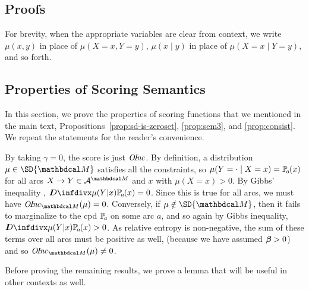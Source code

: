 \begin{subappendices}

\section{Proofs} \label{sec:proofs}
For brevity, when the appropriate variables are clear from context,
we write $\mu(x, y)$
in place of $\mu(X \!=\! x, Y \!=\! y)$, $\mu(x \mid y)$ in place of
$\mu(X \!=\! x\mid Y \!=\! y)$, and so forth.

	
\subsection{Properties of Scoring Semantics}

In this section, we prove the properties of scoring functions that we
mentioned in the main text,
Propositions~\ref{prop:sd-is-zeroset}, \ref{prop:sem3}, and
\ref{prop:consist}.  We repeat the statements for the reader's convenience.

\begin{lproof}\label{proof:sd-is-zeroset}
	 By taking $\gamma = 0$, the score is just $\mathit{O\mskip-2.5muI\mskip-3.5mun\mskip-1.7muc}$. By
			 definition, a distribution $\mu \in \SD{\dg M}$ satisfies
	  all the
			 constraints, so $\mu(Y = \cdot \mid X=x) =
			 \p_a(x)$ for all arcs $X \rightarrow Y \in \Ar^{\dg
			   M}$ and $x$ with 
			 $\mu(X=x)>0$. By Gibbs' inequality
			 \citep{mackay2003information}, 
			 $\kldiv{\mu(Y|x)}{\p_a(x)} = 0$. Since this is true
			 for all arcs, we must have $\OInc_{\dg M}( \mu) =
			 0$. Conversely, if $\mu \notin \SD{\dg M}$, then it
			 fails to marginalize to the cpd $\p_a$ on some arc
							  $a$, and so again by Gibbs inequality,
			 $\kldiv{\mu(Y|x)}{\p_a(x)} > 0$. As relative entropy
			 is non-negative, the sum of these terms over all
			 arcs must be positive as well, (because we have assumed $\boldsymbol\beta > 0$) and so $\OInc_{\dg M}(
			 \mu) \neq 0$. %
\end{lproof}


Before proving the remaining results, we prove a lemma that will be useful
in other contexts as well. 

\end{subappendices}
